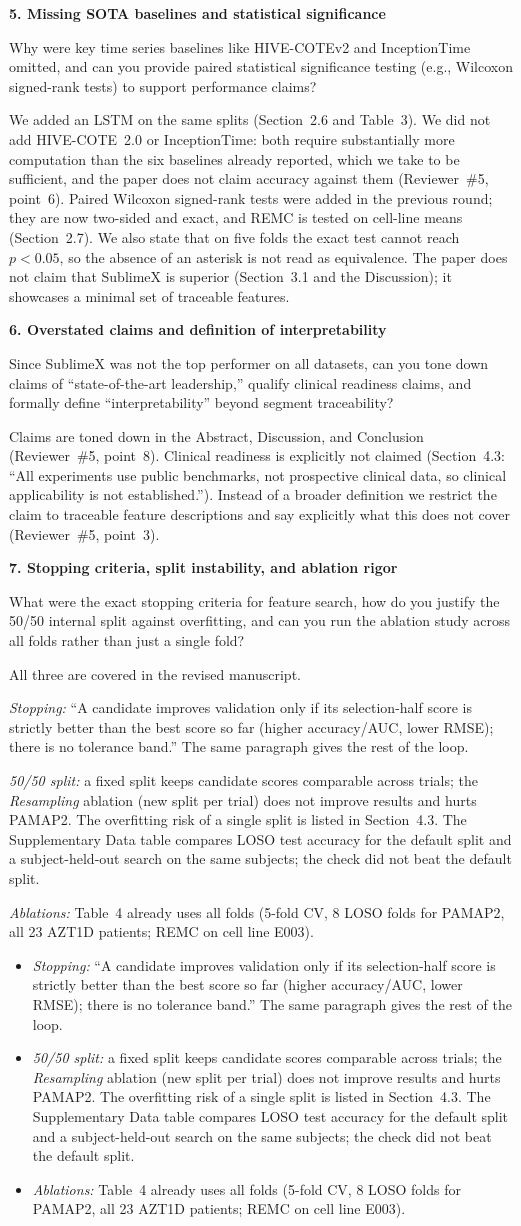 \documentclass[11pt]{article}
\makeatletter
\newcommand{\rsp}{\par\vspace{0.9em}}
\newcommand{\rcitem}[2]{\begin{reviewerbox}\textbf{#1}\par\smallskip#2\end{reviewerbox}}
\newcommand{\response}[2]{%
  \begin{responsebox}#1%
  \def\@responseitems{#2}%
  \ifx\@responseitems\empty\else\begin{itemize}[nosep,leftmargin=1.2em]#2\end{itemize}\fi
  \end{responsebox}\rsp}
\makeatother
\begin{document}
\rcitem{5. Missing SOTA baselines and statistical significance}{Why were key time series baselines like
HIVE-COTEv2 and InceptionTime omitted, and can you provide paired statistical significance testing
(e.g., Wilcoxon signed-rank tests) to support performance claims?}

\response{We added an LSTM on the same splits (Section~2.6 and Table~3). We did not add HIVE-COTE~2.0
or InceptionTime: both require substantially more computation than the six baselines already reported,
which we take to be sufficient, and the paper does not claim accuracy against them (Reviewer~\#5,
point~6). Paired Wilcoxon signed-rank tests were added in the previous
round; they are now two-sided and exact, and REMC is tested on cell-line means (Section~2.7).
We also state that on five folds the exact test cannot reach $p<0.05$, so the absence
of an asterisk is not read as equivalence. The paper does not claim that SublimeX is superior
(Section~3.1 and the Discussion); it showcases a minimal set of traceable features.}{}

\rcitem{6. Overstated claims and definition of interpretability}{Since SublimeX was not the top
performer on all datasets, can you tone down claims of ``state-of-the-art leadership,'' qualify clinical
readiness claims, and formally define ``interpretability'' beyond segment traceability?}

\response{Claims are toned down in the Abstract, Discussion, and Conclusion (Reviewer~\#5, point~8).
Clinical readiness is explicitly not claimed (Section~4.3: ``All experiments use public benchmarks,
not prospective clinical data, so clinical applicability is not established.''). Instead of a broader
definition we restrict the claim to traceable feature descriptions and say explicitly what this does
not cover (Reviewer~\#5, point~3).}{}

\rcitem{7. Stopping criteria, split instability, and ablation rigor}{What were the exact stopping
criteria for feature search, how do you justify the 50/50 internal split against overfitting, and can
you run the ablation study across all folds rather than just a single fold?}

\response{All three are covered in the revised manuscript.}{
  \item \emph{Stopping:} ``A candidate improves validation only if its selection-half score is
    strictly better than the best score so far (higher accuracy/AUC, lower RMSE); there is no
    tolerance band.'' The same paragraph gives the rest of the loop.
  \item \emph{50/50 split:} a fixed split keeps candidate scores comparable across trials; the
    \emph{Resampling} ablation (new split per trial) does not improve results and hurts PAMAP2. The
    overfitting risk of a single split is listed in Section~4.3. The Supplementary Data table
    compares LOSO test accuracy for the default split and a subject-held-out search on the same
    subjects; the check did not beat the default split.
  \item \emph{Ablations:} Table~4 already uses all folds (5-fold CV, 8 LOSO folds for PAMAP2, all
    23 AZT1D patients; REMC on cell line E003).
}
\end{document}
